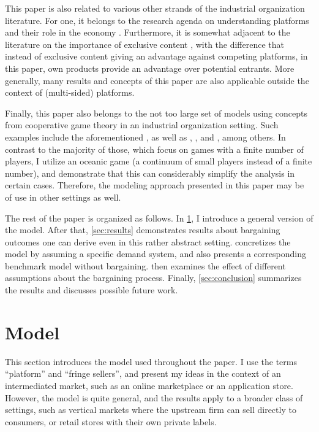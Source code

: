 \documentclass[a4paper]{article}
\begin{document}
This paper is also related to various other strands of the industrial organization literature.
For one, it belongs to the research agenda on understanding platforms and their role in the economy \parencite[e.g.][]{rochet2003platform,hagiu2004optimal,armstrong2006competition,evans2011platform,lee2014competing}.
Furthermore, it is somewhat adjacent to the literature on the importance of exclusive content \parencite[e.g.][]{hagiu2011exclusivity,lee2013vertical,dou2014sell,weeds2016tv}, with the difference that instead of exclusive content giving an advantage against competing platforms, in this paper, own products provide an advantage over potential entrants.
More generally, many results and concepts of this paper are also applicable outside the context of (multi-sided) platforms.

Finally, this paper also belongs to the not too large set of models using concepts from cooperative game theory in an industrial organization setting.
Such examples include the aforementioned \textcite{montez2007downstream}, as well as \textcite{hart1990property}, \textcite{levy1997individual}, \textcite{inderst2003bargaining} and \textcite{brugemann2019intra}, among others.
In contrast to the majority of those, which focus on games with a finite number of players, I utilize an oceanic game (a continuum of small players instead of a finite number), and demonstrate that this can considerably simplify the analysis in certain cases.
Therefore, the modeling approach presented in this paper may be of use in other settings as well.

The rest of the paper is organized as follows.
In \cref{sec:model}, I introduce a general version of the model.
After that, \cref{sec:results} demonstrates results about bargaining outcomes one can derive even in this rather abstract setting.
 concretizes the model by assuming a specific demand system, and also presents a corresponding benchmark model without bargaining.
 then examines the effect of different assumptions about the bargaining process.
Finally, \cref{sec:conclusion} summarizes the results and discusses possible future work.


\section{Model}
\label{sec:model}

This section introduces the model used throughout the paper.
I use the terms ``platform'' and ``fringe sellers'', and present my ideas in the context of an intermediated market, such as an online marketplace or an application store.
However, the model is quite general, and the results apply to a broader class of settings, such as vertical markets where the upstream firm can sell directly to consumers, or retail stores with their own private labels.
\end{document}
